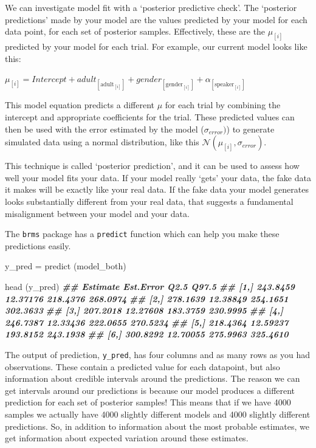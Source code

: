 \documentclass[
]{book}
\newenvironment{Shaded}{\begin{snugshade}}{\end{snugshade}}
\newcommand{\DocumentationTok}[1]{\textcolor[rgb]{0.56,0.35,0.01}{\textbf{\textit{#1}}}}
\newcommand{\FunctionTok}[1]{\textcolor[rgb]{0.00,0.00,0.00}{#1}}
\newcommand{\NormalTok}[1]{#1}
\newcommand{\OtherTok}[1]{\textcolor[rgb]{0.56,0.35,0.01}{#1}}
\begin{document}
We can investigate model fit with a `posterior predictive check'. The `posterior predictions' made by your model are the values predicted by your model for each data point, for each set of posterior samples. Effectively, these are the \(\mu_{[i]}\) predicted by your model for each trial. For example, our current model looks like this:

\(\mu_{[i]} = Intercept + adult_{[\mathrm{adult}_{[i]}]} + gender_{[\mathrm{gender}_{[i]}]} + \alpha_{[\mathrm{speaker}_{[i]}]}\)

This model equation predicts a different \(\mu\) for each trial by combining the intercept and appropriate coefficients for the trial. These predicted values can then be used with the error estimated by the model (\(\sigma_{error})\)) to generate simulated data using a normal distribution, like this \(\mathcal{N}(\mu_{[i]},\sigma_{error})\).

This technique is called `posterior prediction', and it can be used to assess how well your model fits your data. If your model really `gets' your data, the fake data it makes will be exactly like your real data. If the fake data your model generates looks substantially different from your real data, that suggests a fundamental misalignment between your model and your data.

The \texttt{brms} package has a \texttt{predict} function which can help you make these predictions easily.

\begin{Shaded}
\begin{Highlighting}[]
\NormalTok{y\_pred }\OtherTok{=} \FunctionTok{predict}\NormalTok{ (model\_both)}

\FunctionTok{head}\NormalTok{ (y\_pred)}
\DocumentationTok{\#\#      Estimate Est.Error     Q2.5    Q97.5}
\DocumentationTok{\#\# [1,] 243.8459  12.37176 218.4376 268.0974}
\DocumentationTok{\#\# [2,] 278.1639  12.38849 254.1651 302.3633}
\DocumentationTok{\#\# [3,] 207.2018  12.27608 183.3759 230.9995}
\DocumentationTok{\#\# [4,] 246.7387  12.33436 222.0655 270.5234}
\DocumentationTok{\#\# [5,] 218.4364  12.59237 193.8152 243.1938}
\DocumentationTok{\#\# [6,] 300.8292  12.70055 275.9963 325.4610}
\end{Highlighting}
\end{Shaded}

The output of prediction, \texttt{y\_pred}, has four columns and as many rows as you had observations. These contain a predicted value for each datapoint, but also information about credible intervals around the predictions. The reason we can get intervals around our predictions is because our model produces a different prediction for each set of posterior samples! This means that if we have 4000 samples we actually have 4000 slightly different models and 4000 slightly different predictions. So, in addition to information about the most probable estimates, we get information about expected variation around these estimates.
\end{document}
